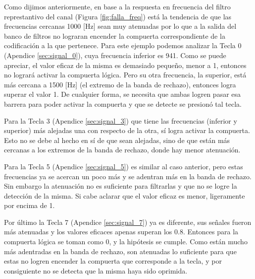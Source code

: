 Como dijimos anteriormente, en base a la respuesta en frecuencia del filtro represtantivo del canal (Figura \ref{fig:falla_freq}) está la tendencia de que las frecuencias cercanas 1000 [Hz] sean muy atenuadas por lo que a la salida del banco de filtros no lograran encender la compuerta correspondiente de la codificación a la que pertenece. Para este ejemplo podemos analizar la Tecla 0 (Apendice \ref{sec:signal_0}), cuya frecuencia inferior es 941. Como se puede apreciar, el valor eficaz de la misma es demasiado pequeño, menor a 1, entonces no logrará activar la compuerta lógica. Pero su otra frecuencia, la superior, está más cercana a 1500 [Hz] (el extremo de la banda de rechazo), entonces logra superar el valor 1. De cualquier forma, se necesita que ambas logren pasar esa barrera para poder activar la compuerta y que se detecte se presionó tal tecla.

Para la Tecla 3 (Apendice \ref{sec:signal_3}) que tiene las frecuencias (inferior y superior) más alejadas una con respecto de la otra, sí logra activar la compuerta. Esto no se debe al hecho en sí de que sean alejadas, sino de que están más cercanas a los extremos de la banda de rechazo, donde hay menor atenuación.

Para la Tecla 5 (Apendice \ref{sec:signal_5}) es similar al caso anterior, pero estas frecuencias ya se acercan un poco más y se adentran más en la banda de rechazo. Sin embargo la atenuación no es suficiente para filtrarlas y que no se logre la detección de la misma. Si cabe aclarar que el valor eficaz es menor, ligeramente por encima de 1.

Por último la Tecla 7 (Apendice \ref{sec:signal_7}) ya es diferente, sus señales fueron más atenuadas y los valores eficaces apenas superan los 0.8. Entonces para la compuerta lógica se toman como 0, y la hipótesis se cumple. Como están mucho más adentradas en la banda de rechazo, son atenuadas lo suficiente para que estas no logren encender la compuerta que corresponde a la tecla, y por consiguiente no se detecta que la misma haya sido oprimida.